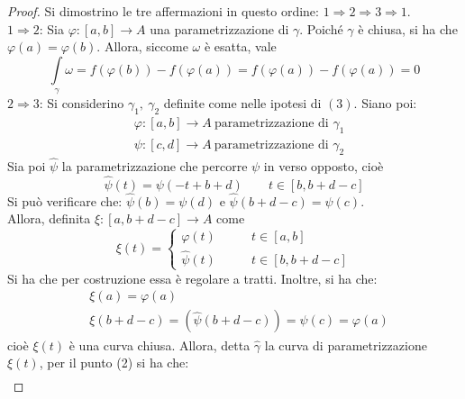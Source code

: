 \begin{proof}
    Si dimostrino le tre affermazioni in questo ordine: $1 \Rightarrow 2 \Rightarrow 3 \Rightarrow 1$.\\
    $1 \Rightarrow 2$: Sia $\varphi: [a,b] \to A$ una parametrizzazione di $\gamma$. Poiché $\gamma$ è chiusa, si ha che $\varphi(a)=\varphi(b)$. Allora, siccome $\omega$ è esatta, vale 
    \begin{equation*}
        \int\limits_{\gamma}{\omega} = f(\varphi(b))- f(\varphi(a)) = f(\varphi(a))-f(\varphi(a))=0
    \end{equation*}
    $2 \Rightarrow 3$: Si considerino $\gamma_1,\ \gamma_2$ definite come nelle ipotesi di $(3)$. Siano poi:
    \begin{equation*}
        \begin{aligned}
            &\varphi: [a,b] \to A \ \text{parametrizzazione di } \gamma_1\\
            &\psi:[c, d] \to A \ \text{parametrizzazione di } \gamma_2
        \end{aligned}
    \end{equation*}
    Sia poi $\hat{\psi}$ la parametrizzazione che percorre $\psi$ in verso opposto, cioè
    \begin{equation*}
        \hat{\psi}(t)= \psi(-t+b+d) \qquad t \in [b, b+d-c]
    \end{equation*}
Si può verificare che: $\hat{\psi}(b)= \psi(d)$ e $\hat{\psi}(b+d-c)=\psi(c)$.\\
Allora, definita $\xi: [a, b+d-c] \to A$ come
\begin{equation*}
    \xi(t)= \begin{cases}
        \varphi(t) \qquad & t \in [a,b]\\
        \hat{\psi}(t) \qquad & t \in [b, b+d-c]
    \end{cases}
\end{equation*}
Si ha che per costruzione essa è regolare a tratti. Inoltre, si ha che:
\begin{equation*}
\begin{aligned}
    &\xi(a)= \varphi(a)\\
    &\xi(b+d-c)= (\hat{\psi}(b+d-c))=\psi(c)=\varphi(a)
\end{aligned}
\end{equation*}
cioè $\xi(t)$ è una curva chiusa. Allora, detta $\hat{\gamma}$ la curva di parametrizzazione $\xi(t)$, per il punto (2) si ha che:
\begin{equation*}
\begin{aligned}

\end{aligned}
\end{equation*}
\end{proof}
